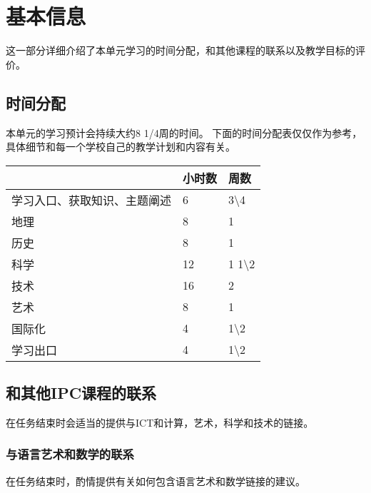 \chapter{基本信息}
    这一部分详细介绍了本单元学习的时间分配，和其他课程的联系以及教学目标的评价。

\section{时间分配}
    本单元的学习预计会持续大约8 1/4周的时间。  
    下面的时间分配表仅仅作为参考，具体细节和每一个学校自己的教学计划和内容有关。

\begin{table}[h]
\begin{tabular}{l|l|l}
\hline
\colorbox[gray]{0.95}{ & 小时数 & 周数} \\
\hline
学习入口、获取知识、主题阐述 & 6 & 3\textbackslash4 \\
地理 & 8 & 1  \\
历史 & 8 & 1 \\
科学 & 12 & 1 1\textbackslash2 \\
技术 & 16 & 2 \\
艺术 & 8 & 1 \\
国际化 & 4 & 1\textbackslash2 \\
学习出口 & 4 & 1\textbackslash2 \\
\hline
\end{tabular}
\end{table}


\section{和其他IPC课程的联系}
   在任务结束时会适当的提供与ICT和计算，艺术，科学和技术的链接。
\subsection{与语言艺术和数学的联系}
   在任务结束时，酌情提供有关如何包含语言艺术和数学链接的建议。
